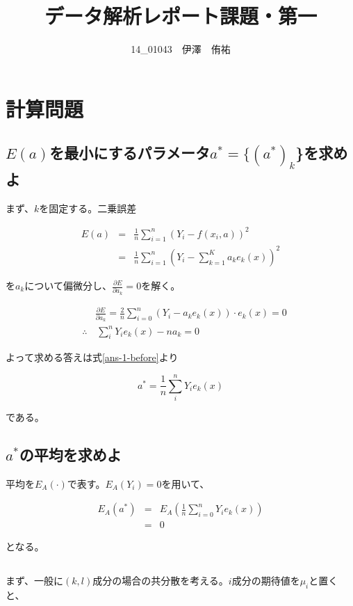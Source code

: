 \documentclass[a4paper,xelatex,ja=standard,jafont=hiragino-pron]{bxjsarticle}
\title{データ解析レポート課題・第一}
\author{14\_01043　伊澤　侑祐}
\date{}
\begin{document}
\maketitle
\section{計算問題}
\subsection{$E(a)$を最小にするパラメータ$a^* = \{(a^*)_k$\}を求めよ}
まず、$k$を固定する。二乗誤差

\begin{eqnarray}
  E(a) &=& \frac{1}{n} \sum_{i = 1}^n (Y_i - f(x_i, a))^2 \nonumber \\
       &=& \frac{1}{n} \sum_{i = 1}^n (Y_i - \sum_{k = 1}^K a_k e_k(x))^2
\end{eqnarray}

を$a_k$について偏微分し、$\frac{\partial E}{\partial a_k} = 0$を解く。

\begin{eqnarray}
  &&\frac{\partial E}{\partial a_k}
    = \frac{2}{n} \sum_{i = 0}^n (Y_i - a_ke_k(x)) \cdot e_k(x) = 0 \\
    &\therefore& \, \sum_i^n Y_i e_k(x) - n a_k = 0
    \label{ans-1-before}
\end{eqnarray}

よって求める答えは式\ref{ans-1-before}より

\begin{equation}
  a^* = \frac{1}{n} \sum_i^n Y_i e_k(x)
\end{equation}

である。

\subsection{$a^*$の平均を求めよ}
平均を$E_A(\cdot)$で表す。$E_A(Y_i) = 0$を用いて、

\begin{eqnarray}
  E_A(a^*)
    &=& E_A \left(\frac{1}{n}\sum_{i=0}^n Y_i e_k (x) \right) \nonumber \\
    &=& 0
\end{eqnarray}

となる。
\subsection{}
まず、一般に$(k, l)$成分の場合の共分散を考える。$i$成分の期待値を$\mu_i$と置くと、
\end{document}

